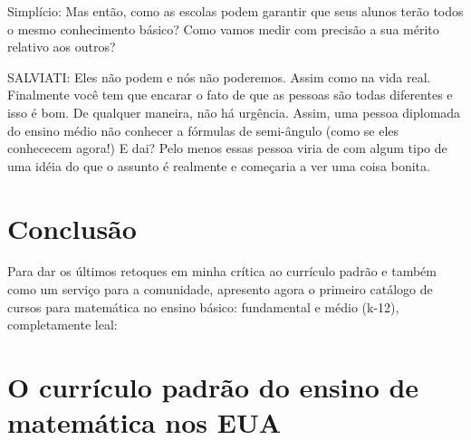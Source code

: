 \documentclass[a4paper,oneside,12pt,notitlepage]{article}
\begin{document}
Simplício: Mas então, como as escolas podem garantir que seus alunos terão todos o mesmo conhecimento básico? Como vamos medir com precisão a sua mérito relativo aos outros? 

SALVIATI: Eles não podem e nós não poderemos. Assim como na vida real. Finalmente você tem que encarar o fato de que as pessoas são todas diferentes e isso é bom. De qualquer maneira, não há urgência. Assim, uma pessoa diplomada do ensino médio não conhecer a fórmulas de semi-ângulo  (como se eles conhececem agora!) E dai? Pelo menos essas pessoa viria de com algum tipo de uma idéia do que o assunto é realmente e começaria a ver uma coisa bonita. 


\section*{Conclusão}
Para dar os últimos retoques em minha crítica ao currículo padrão e também como um serviço para a comunidade, apresento agora o primeiro catálogo de cursos para matemática no ensino básico: fundamental e médio (k-12), completamente leal:






\section*{O currículo padrão do ensino de matemática nos EUA}
\end{document}

